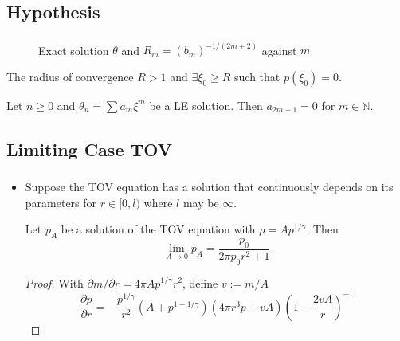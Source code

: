 \subsection{Hypothesis}
\begin{frame}
	\frametitle{\insertsubsection}
	\begin{figure}
		\caption{Exact solution $\theta$ and $R_m=(b_m)^{-1/(2m+2)}$ against $m$}
	\end{figure}
	\pause
	\begin{hypothesis}
		The radius of convergence $R>1$ and $\exists\xi_0\geq R$ such that $p(\xi_0)=0$.
	\end{hypothesis}
	\pause
	\begin{hypothesis}
		Let  $n\geq0$ and $\theta_n=\sum a_m\xi^m$ be a LE solution. Then $a_{2m+1}=0$ for $m\in\mathbb{N}$.
	\end{hypothesis}
\end{frame}


\subsection{Limiting Case TOV}
\begin{frame}
	\frametitle{\insertsubsection}
	\begin{itemize}[<+->]
		\item Suppose the TOV equation has a solution that continuously depends on its parameters for $r\in[0,l)$ where $l$ may be $\infty$.
		\begin{theorem}
			Let $p_A$ be a solution of the TOV equation with $\rho=Ap^{1/\gamma}$. Then 
			\begin{equation}
				\lim_{A\rightarrow0}p_A=\frac{p_0}{2\pi p_0r^2+1}
			\end{equation}
		\end{theorem}
		\begin{proof}
			With $\partial m/\partial r = 4\pi Ap^{1/\gamma}r^2$, define $v:=m/A$
			\begin{equation}
				\frac{\partial p}{\partial r} = -\frac{p^{1/\gamma}}{r^2}\left(A+p^{1-1/\gamma}\right)\left(4\pi r^3p+vA\right)\left(1-\frac{2vA}{r}\right)^{-1}
			\end{equation}
		\end{proof}
	\end{itemize}
\end{frame}

